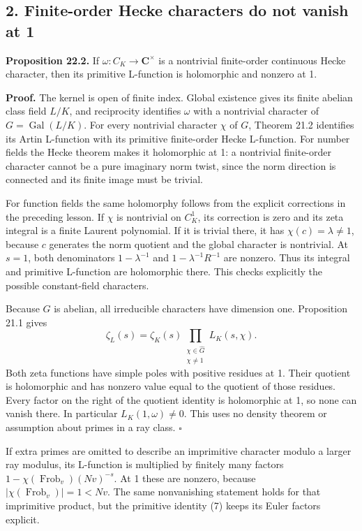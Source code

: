 \documentclass[11pt,a4paper]{article}
\begin{document}
\subsection{2. Finite-order Hecke characters do not vanish at
1}\label{finite-order-hecke-characters-do-not-vanish-at-1}

\textbf{Proposition 22.2.} If \(\omega:C_K\to\mathbf C^\times\) is a
nontrivial finite-order continuous Hecke character, then its primitive
L-function is holomorphic and nonzero at 1.

\textbf{Proof.} The kernel is open of finite index. Global existence
gives its finite abelian class field \(L/K\), and reciprocity identifies
\(\omega\) with a nontrivial character of \(G=\operatorname{Gal}(L/K)\).
For every nontrivial character \(\chi\) of \(G\), Theorem 21.2
identifies its Artin L-function with its primitive finite-order Hecke
L-function. For number fields the Hecke theorem makes it holomorphic at
1: a nontrivial finite-order character cannot be a pure imaginary norm
twist, since the norm direction is connected and its finite image must
be trivial.

For function fields the same holomorphy follows from the explicit
corrections in the preceding lesson. If \(\chi\) is nontrivial on
\(C_K^1\), its correction is zero and its zeta integral is a finite
Laurent polynomial. If it is trivial there, it has
\(\chi(c)=\lambda\ne1\), because \(c\) generates the norm quotient and
the global character is nontrivial. At \(s=1\), both denominators
\(1-\lambda^{-1}\) and \(1-\lambda^{-1}R^{-1}\) are nonzero. Thus its
integral and primitive L-function are holomorphic there. This checks
explicitly the possible constant-field characters.

Because \(G\) is abelian, all irreducible characters have dimension one.
Proposition 21.1 gives \[
\zeta_L(s)=\zeta_K(s)\prod_{\substack{\chi\in\widehat G\\\chi\ne1}}L_K(s,\chi).
\tag{7}
\] Both zeta functions have simple poles with positive residues at 1.
Their quotient is holomorphic and has nonzero value equal to the
quotient of those residues. Every factor on the right of the quotient
identity is holomorphic at 1, so none can vanish there. In particular
\(L_K(1,\omega)\ne0\). This uses no density theorem or assumption about
primes in a ray class. \(\square\)

If extra primes are omitted to describe an imprimitive character modulo
a larger ray modulus, its L-function is multiplied by finitely many
factors \(1-\chi(\operatorname{Frob}_v)(Nv)^{-s}\). At 1 these are
nonzero, because \(|\chi(\operatorname{Frob}_v)|=1<Nv\). The same
nonvanishing statement holds for that imprimitive product, but the
primitive identity (7) keeps its Euler factors explicit.
\end{document}
